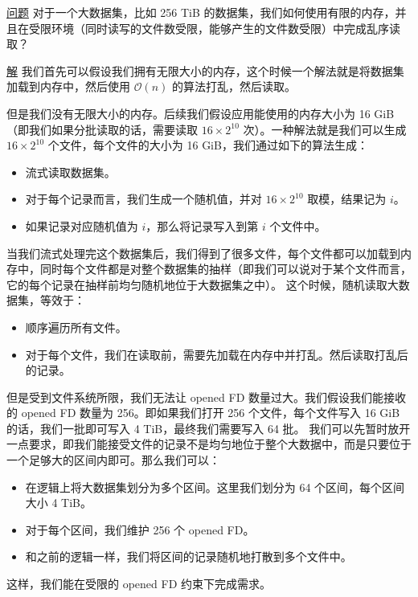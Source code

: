 \documentclass[utf8,a4paper,nofonts,9pt]{ctexbook}
\begin{document}
\underline{问题} 对于一个大数据集，比如 256 TiB 的数据集，我们如何使用有限的内存，并且在受限环境（同时读写的文件数受限，能够产生的文件数受限）中完成乱序读取？

\underline{解} 我们首先可以假设我们拥有无限大小的内存，这个时候一个解法就是将数据集加载到内存中，然后使用 $\mathcal{O}(n)$ 的算法打乱，然后读取。

但是我们没有无限大小的内存。后续我们假设应用能使用的内存大小为 16 GiB（即我们如果分批读取的话，需要读取 $16 \times 2^{10}$ 次）。一种解法就是我们可以生成 $16 \times 2^{10}$ 个文件，每个文件的大小为 16 GiB，我们通过如下的算法生成：

\begin{itemize}
    \item 流式读取数据集。
    \item 对于每个记录而言，我们生成一个随机值，并对 $16 \times 2^{10}$ 取模，结果记为 $i$。
    \item 如果记录对应随机值为 $i$，那么将记录写入到第 $i$ 个文件中。
\end{itemize}

当我们流式处理完这个数据集后，我们得到了很多文件，每个文件都可以加载到内存中，同时每个文件都是对整个数据集的抽样（即我们可以说对于某个文件而言，它的每个记录在抽样前均匀随机地位于大数据集之中）。
这个时候，随机读取大数据集，等效于：

\begin{itemize}
    \item 顺序遍历所有文件。
    \item 对于每个文件，我们在读取前，需要先加载在内存中并打乱。然后读取打乱后的记录。
\end{itemize}

但是受到文件系统所限，我们无法让 opened FD 数量过大。我们假设我们能接收的 opened FD 数量为 256。即如果我们打开 256 个文件，每个文件写入 16 GiB 的话，我们一批即可写入 4 TiB，最终我们需要写入 64 批。
我们可以先暂时放开一点要求，即我们能接受文件的记录不是均匀地位于整个大数据中，而是只要位于一个足够大的区间内即可。那么我们可以：

\begin{itemize}
    \item 在逻辑上将大数据集划分为多个区间。这里我们划分为 64 个区间，每个区间大小 4 TiB。
    \item 对于每个区间，我们维护 256 个 opened FD。
    \item 和之前的逻辑一样，我们将区间的记录随机地打散到多个文件中。
\end{itemize}

这样，我们能在受限的 opened FD 约束下完成需求。
\end{document}
